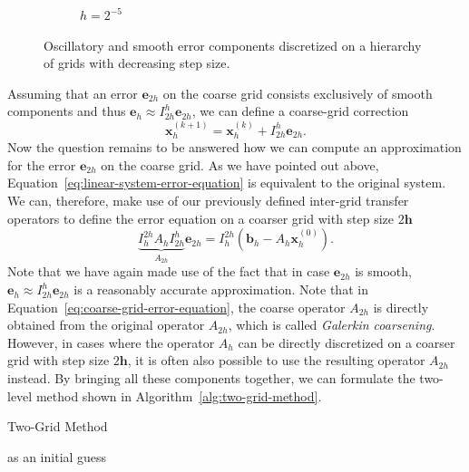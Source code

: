 \begin{figure}[t]
\begin{subfigure}[b]{0.32\textwidth}
		\caption{$h = 2^{-5}$}
	\end{subfigure}
	\caption[Oscillatory and smooth error components discretized on a hierarchy of grids with decreasing step size]{Oscillatory and smooth error components discretized on a hierarchy of grids with decreasing step size.}
	\label{fig:error-on-multiple-levels}
\end{figure}
Assuming that an error $\bm{e}_{2h}$ on the coarse grid consists exclusively of smooth components and thus $\bm{e}_{h} \approx I_{2h}^{h} \bm{e}_{2h}$, we can define a coarse-grid correction 
\begin{equation}
	\bm{x}^{(k+1)}_h = \bm{x}^{(k)}_h + I_{2h}^h \bm{e}_{2h}.
\end{equation} 
Now the question remains to be answered how we can compute an approximation for the error $\bm{e}_{2h}$ on the coarse grid.
As we have pointed out above, Equation~\eqref{eq:linear-system-error-equation} is equivalent to the original system.
We can, therefore, make use of our previously defined inter-grid transfer operators to define the error equation on a coarser grid with step size $2\bm{h}$
\begin{equation}
	\underbrace{I_{h}^{2h} A_h I_{2h}^h}_{A_{2h}} \bm{e}_{2h} = I_{h}^{2h} \left(\bm{b}_h - A_h \bm{x}^{(0)}_h\right).
	\label{eq:coarse-grid-error-equation}
\end{equation}
Note that we have again made use of the fact that in case $\bm{e}_{2h}$ is smooth, $\bm{e}_{h} \approx I_{2h}^{h} \bm{e}_{2h}$ is a reasonably accurate approximation.
Note that in Equation~\eqref{eq:coarse-grid-error-equation}, the coarse operator $A_{2h}$ is directly obtained from the original operator $A_{2h}$, which is called \emph{Galerkin coarsening}.
However, in cases where the operator $A_h$ can be directly discretized on a coarser grid with step size $2\bm{h}$, it is often also possible to use the resulting operator $A_{2h}$ instead.
By bringing all these components together, we can formulate the two-level method shown in Algorithm~\ref{alg:two-grid-method}.
\begin{algorithm}
	\caption{Two-Grid Method}
	\label{alg:two-grid-method}
	\begin{algorithmic}
		 as an initial guess
	\end{algorithmic}
\end{algorithm}
